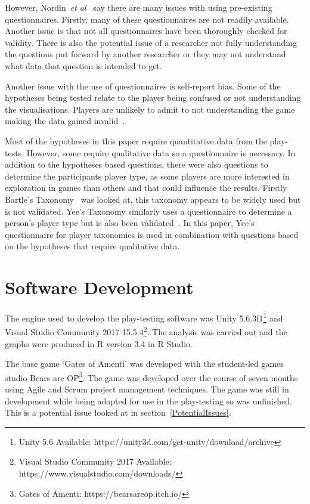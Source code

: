 \documentclass[journal]{IEEEtran}
\begin{document}
	However, Nordin~\textit{et al}~\cite{nordin2014} say there are many issues with using pre-existing questionnaires. Firstly, many of these questionnaires are not readily available. Another issue is that not all questionnaires have been thoroughly checked for validity. There is also the potential issue of a researcher not fully understanding the questions put forward by another researcher or they may not understand what data that question is intended to get.
	
	Another issue with the use of questionnaires is self-report bias. Some of the hypotheses being tested relate to the player being confused or not understanding the visualisations. Players are unlikely to admit to not understanding the game making the data gained invalid~\cite{donaldson2002}.
	
	Most of the hypotheses in this paper require quantitative data from the play-tests. However, some require qualitative data so a questionnaire is necessary.  In addition to the hypotheses based questions, there were also questions to determine the participants player type, as some players are more interested in exploration in games than others and that could influence the results. 
	Firstly Bartle's Taxonomy~\cite{Bartle1996} was looked at, this taxonomy appears to be widely used but is not validated. Yee's Taxonomy similarly uses a questionnaire to determine a person's player type but is also been validated~\cite{Yee2006. Yee2012}.  In this paper, Yee's questionnaire for player taxonomies is used in combination with questions based on the hypotheses that require qualitative data. 
	
	\section{Software Development} \label{softdev}
	The engine used to develop the play-testing software was Unity 5.6.3f1\footnote[3]{Unity 5.6 Available: https://unity3d.com/get-unity/download/archive} and Visual Studio Community 2017  15.5.4\footnote[4]{Visual Studio Community 2017 Available: https://www.visualstudio.com/downloads/}.  The analysis was carried out and the graphs were produced in R version 3.4 in R Studio.
	
	The base game `Gates of Amenti' was developed with the student-led games studio Bears are OP\footnote[5]{Gates of Amenti: https://bearsareop.itch.io/}. The game was developed over the course of seven months using Agile and Scrum project management techniques. The game was still in development while being adapted for use in the play-testing so was unfinished. This is a potential issue looked at in section~\ref{PotentialIssues}. 
	
\end{document}
